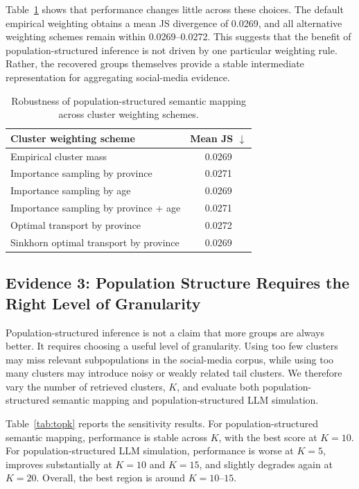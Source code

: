 \documentclass{article}
\begin{document}
Table~\ref{tab:reweighting} shows that performance changes little across these choices.
The default empirical weighting obtains a mean JS divergence of 0.0269, and all
alternative weighting schemes remain within 0.0269--0.0272.
This suggests that the benefit of population-structured inference is not driven by one
particular weighting rule.
Rather, the recovered groups themselves provide a stable intermediate representation for
aggregating social-media evidence.

\begin{table}[htb!]
\centering
\small
\begin{tabular}{lc}
\toprule
Cluster weighting scheme & Mean JS $\downarrow$ \\
\midrule
Empirical cluster mass & 0.0269 \\
Importance sampling by province & 0.0271 \\
Importance sampling by age & 0.0269 \\
Importance sampling by province + age & 0.0271 \\
Optimal transport by province & 0.0272 \\
Sinkhorn optimal transport by province & 0.0269 \\
\bottomrule
\end{tabular}
\caption{Robustness of population-structured semantic mapping across cluster weighting schemes.}
\label{tab:reweighting}
\end{table}

\subsection{Evidence 3: Population Structure Requires the Right Level of Granularity}
\label{sensitivity}

Population-structured inference is not a claim that more groups are always better.
It requires choosing a useful level of granularity.
Using too few clusters may miss relevant subpopulations in the social-media corpus, while
using too many clusters may introduce noisy or weakly related tail clusters.
We therefore vary the number of retrieved clusters, $K$, and evaluate both
population-structured semantic mapping and population-structured LLM simulation.

Table~\ref{tab:topk} reports the sensitivity results.
For population-structured semantic mapping, performance is stable across $K$, with the
best score at $K=10$.
For population-structured LLM simulation, performance is worse at $K=5$, improves
substantially at $K=10$ and $K=15$, and slightly degrades again at $K=20$.
Overall, the best region is around $K=10$--$15$.
\end{document}
